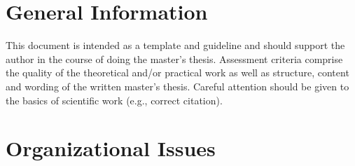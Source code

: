 \section{General Information}

This document is intended as a template and guideline and should support the author in the course of doing the master's thesis.
Assessment criteria comprise the quality of the theoretical and/or practical work as well as structure, content and wording of the written master's thesis. Careful attention should be given to the basics of scientific work (e.g., correct citation).

\section{Organizational Issues}

